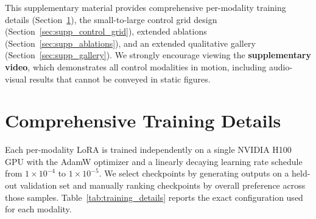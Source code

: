 
This supplementary material provides comprehensive per-modality training details (Section~\ref{sec:supp_implementation}), the small-to-large control grid design (Section~\ref{sec:supp_control_grid}), extended ablations (Section~\ref{sec:supp_ablations}), and an extended qualitative gallery (Section~\ref{sec:supp_gallery}).
We strongly encourage viewing the \textbf{supplementary video}, which demonstrates all control modalities in motion, including audio-visual results that cannot be conveyed in static figures.


\section{Comprehensive Training Details}
\label{sec:supp_implementation}

Each per-modality LoRA is trained independently on a single NVIDIA H100 GPU with the AdamW optimizer and a linearly decaying learning rate schedule from $1 \times 10^{-4}$ to $1 \times 10^{-5}$. We select checkpoints by generating outputs on a held-out validation set and manually ranking checkpoints by overall preference across those samples. Table~\ref{tab:training_details} reports the exact configuration used for each modality.


